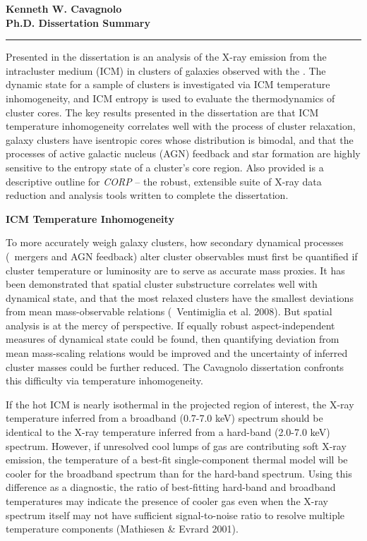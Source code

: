 \documentclass[12pt]{cv}
\begin{document}
\begin{center}
{\large \textbf{Kenneth W. Cavagnolo\\Ph.D. Dissertation Summary}}\\
\rule{17.35cm}{2pt}
\normalsize
\end{center}

Presented in the dissertation is an analysis of the X-ray emission
from the intracluster medium (ICM) in clusters of galaxies observed
with the \cxo. The dynamic state for a sample of clusters is
investigated via ICM temperature inhomogeneity, and ICM entropy is
used to evaluate the thermodynamics of cluster cores. The key results
presented in the dissertation are that ICM temperature inhomogeneity
correlates well with the process of cluster relaxation, galaxy
clusters have isentropic cores whose distribution is bimodal, and that
the processes of active galactic nucleus (AGN) feedback and star
formation are highly sensitive to the entropy state of a cluster's
core region. Also provided is a descriptive outline for {\it{CORP}} --
the robust, extensible suite of X-ray data reduction and analysis
tools written to complete the dissertation.

{\bfseries{ICM Temperature Inhomogeneity}}

To more accurately weigh galaxy clusters, how secondary dynamical
processes (\eg\ mergers and AGN feedback) alter cluster observables
must first be quantified if cluster temperature or luminosity are to
serve as accurate mass proxies. It has been demonstrated that spatial
cluster substructure correlates well with dynamical state, and that
the most relaxed clusters have the smallest deviations from mean
mass-observable relations (\eg\ Ventimiglia et al. 2008). But spatial
analysis is at the mercy of perspective. If equally robust
aspect-independent measures of dynamical state could be found, then
quantifying deviation from mean mass-scaling relations would be
improved and the uncertainty of inferred cluster masses could be
further reduced. The Cavagnolo dissertation confronts this difficulty
via temperature inhomogeneity.

If the hot ICM is nearly isothermal in the projected region of
interest, the X-ray temperature inferred from a broadband (0.7-7.0
keV) spectrum should be identical to the X-ray temperature inferred
from a hard-band (2.0-7.0 keV) spectrum. However, if unresolved cool
lumps of gas are contributing soft X-ray emission, the temperature of
a best-fit single-component thermal model will be cooler for the
broadband spectrum than for the hard-band spectrum. Using this
difference as a diagnostic, the ratio of best-fitting hard-band and
broadband temperatures may indicate the presence of cooler gas even
when the X-ray spectrum itself may not have sufficient signal-to-noise
ratio to resolve multiple temperature components (Mathiesen \& Evrard
2001).
\end{document}
